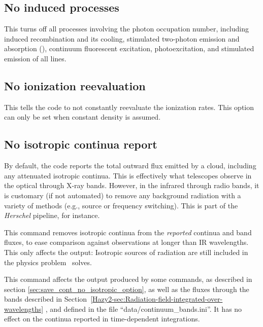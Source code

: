 \subsection{No induced processes}

This turns off all processes involving the photon occupation number, including induced recombination and its cooling, stimulated
two-photon emission and absorption (\citealp{Bottorff2006}), continuum
fluorescent excitation, photoexcitation, and stimulated emission of all lines.

\subsection{No ionization reevaluation}

This tells the code to not constantly reevaluate the ionization rates.
This option can only be set when constant density is assumed.

\subsection{No isotropic continua report}
\label{sec:no_isotropic_continua}

By default, the code reports the total outward flux emitted
by a cloud, including any attenuated isotropic continua.
This is effectively what telescopes observe in the optical
through X-ray bands.
However, in the infrared through radio bands, it is customary
(if not automated) to remove any background radiation with a
variety of methods (e.g., source or frequency switching).
This is part of the {\em Herschel} pipeline, for instance.

\par
This command removes isotropic continua from the {\it reported}
continua and band fluxes, to ease comparison against observations
at longer than IR wavelengths.
This only affects the output:
Isotropic sources of radiation are still included in the physics
problem \Cloudy\ solves.

\par
This command affects the output produced by some  commands,
as described in section \ref{sec:save_cont_no_isotropic_option},
as well as the fluxes through the bands described in
Section~\ref{Hazy2-sec:Radiation-field-integrated-over-wavelengths}
,
and defined in the file ``data/continuum\_bands.ini''.
It has no effect on the continua reported in time-dependent
integrations.

